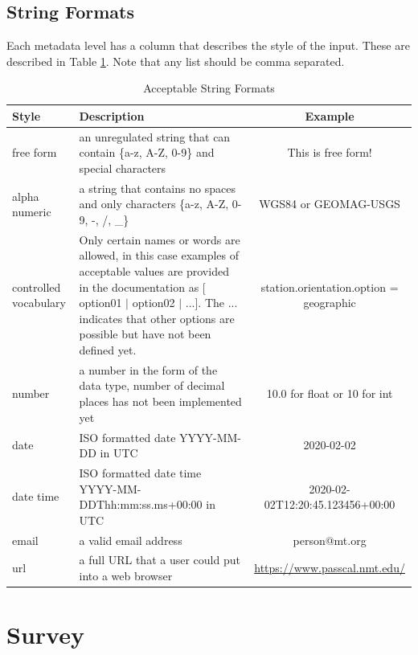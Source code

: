 \documentclass{article}
\begin{document}
\subsection{String Formats}

Each metadata level has a column that describes the style of the input.  These are described in Table \ref{tab:values}.  Note that any list should be comma separated.

\begin{table}[htb!]
	\centering
	\caption[Acceptable String Formats]{Acceptable String Formats}
	\begin{tabular}{|l|p{}|c|}
		\hline
		\textbf{Style} & \textbf{Description}  & \textbf{Example} \\ \hline
		free form & an unregulated string that can contain \{a-z, A-Z, 0-9\} and special characters & This is free form! \\ \hline
		
		alpha numeric & a string that contains no spaces and only characters \{a-z, A-Z, 0-9, -, /, \_\} & WGS84 or GEOMAG-USGS \\ \hline
		controlled vocabulary & Only certain names or words are allowed, in this case examples of acceptable values are provided in the documentation as [ option01 $|$ option02 $|$ ...]. The ... indicates that other options are possible but have not been defined yet. &  station.orientation.option = geographic \\ \hline
		number & a number in the form of the data type, number of decimal places has not been implemented yet & 10.0 for float or 10 for int \\ \hline
		date & ISO formatted date YYYY-MM-DD in UTC & 2020-02-02 \\ \hline
		date time & ISO formatted date time YYYY-MM-DDThh:mm:ss.ms+00:00 in UTC & 2020-02-02T12:20:45.123456+00:00 \\ \hline
		email & a valid email address & person@mt.org \\ \hline
		url & a full URL that a user could put into a web browser  &  \url{https://www.passcal.nmt.edu/} \\ \hline
		
		
	\end{tabular}
	\label{tab:values}
\end{table}

\clearpage
\newpage
\section{Survey}
\end{document}
